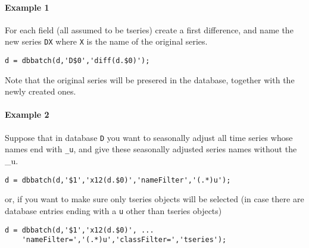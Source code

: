 \paragraph{Example 1}\label{example-1}

For each field (all assumed to be tseries) create a first difference,
and name the new series \texttt{DX} where \texttt{X} is the name of the
original series.

\begin{verbatim}
d = dbbatch(d,'D$0','diff(d.$0)');
\end{verbatim}

Note that the original series will be presered in the database, together
with the newly created ones.

\paragraph{Example 2}\label{example-2}

Suppose that in database \texttt{D} you want to seasonally adjust all
time series whose names end with \texttt{\_u}, and give these seasonally
adjusted series names without the \_u.

\begin{verbatim}
d = dbbatch(d,'$1','x12(d.$0)','nameFilter','(.*)u');
\end{verbatim}

or, if you want to make sure only tseries objects will be selected (in
case there are database entries ending with a \texttt{u} other than
tseries objects)

\begin{verbatim}
d = dbbatch(d,'$1','x12(d.$0)', ...
    'nameFilter=','(.*)u','classFilter=','tseries');
\end{verbatim}


